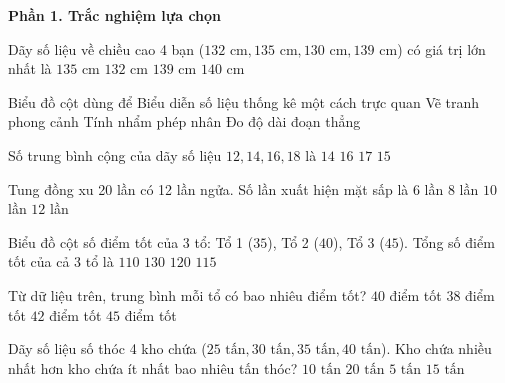 \textbf{Phần 1. Trắc nghiệm lựa chọn}

\begin{ex} %
Dãy số liệu về chiều cao 4 bạn ($132\text{ cm}, 135\text{ cm}, 130\text{ cm}, 139\text{ cm}$) có giá trị lớn nhất là
\choice
{$135\text{ cm}$}
{$132\text{ cm}$}
{\True $139\text{ cm}$}
{$140\text{ cm}$}
\end{ex}

\begin{ex} %
Biểu đồ cột dùng để
\choice
{\True Biểu diễn số liệu thống kê một cách trực quan}
{Vẽ tranh phong cảnh}
{Tính nhẩm phép nhân}
{Đo độ dài đoạn thẳng}
\end{ex}

\begin{ex} %
Số trung bình cộng của dãy số liệu $12, 14, 16, 18$ là
\choice
{$14$}
{$16$}
{$17$}
{\True $15$}
\end{ex}

\begin{ex} %
Tung đồng xu 20 lần có 12 lần ngửa. Số lần xuất hiện mặt sấp là
\choice
{$6$ lần}
{\True $8$ lần}
{$10$ lần}
{$12$ lần}
\end{ex}

\begin{ex} %
Biểu đồ cột số điểm tốt của 3 tổ: Tổ 1 ($35$), Tổ 2 ($40$), Tổ 3 ($45$). Tổng số điểm tốt của cả 3 tổ là
\choice
{$110$}
{$130$}
{\True $120$}
{$115$}
\end{ex}

\begin{ex} %
Từ dữ liệu trên, trung bình mỗi tổ có bao nhiêu điểm tốt?
\choice
{\True $40$ điểm tốt}
{$38$ điểm tốt}
{$42$ điểm tốt}
{$45$ điểm tốt}
\end{ex}

\begin{ex} %
Dãy số liệu số thóc 4 kho chứa ($25\text{ tấn}, 30\text{ tấn}, 35\text{ tấn}, 40\text{ tấn}$). Kho chứa nhiều nhất hơn kho chứa ít nhất bao nhiêu tấn thóc?
\choice
{$10\text{ tấn}$}
{$20\text{ tấn}$}
{$5\text{ tấn}$}
{\True $15\text{ tấn}$}
\end{ex}

